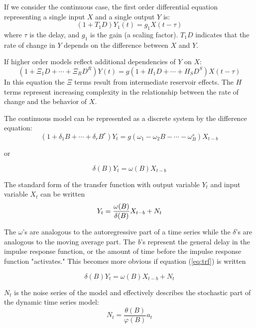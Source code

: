 \documentclass[12pt]{report}
\begin{document}
If we consider the continuous case, the first order differential
equation representing a single input \textit{$X$} and a single
output \textit{$Y$} is:
\begin{equation}
(1+T_1 D)Y_1 (t)=g_1 X(t-\tau)
\end{equation}\label{eq:diffeq}
where $\tau$ is the delay, and $g_1$ is the gain (a scaling
factor). $T_1D$ indicates that the rate of change in $Y$ depends
on the difference between $X$ and $Y$.


If higher order models reflect additional dependencies of $Y$ on
$X$:
\begin{equation}
(1+\Xi_1 D + \cdots +\Xi_R D^R)Y(t)=g(1+H_1 D+\cdots+H_S D^S)
X(t-\tau)
\end{equation}
In this equation the $\Xi$ terms result from intermediate
reservoir effects. The $H$ terms represent increasing complexity
in the relationship between the rate of change and the behavior of
$X$.

The continuous model can be represented as a discrete system by
the difference equation:
\begin{equation}
(1+\delta_1 B + \cdots +\delta_r B^r)Y_t=g(\omega_1-\omega_2 B
-\cdots-\omega_ B^s) X_{t-b}
\end{equation}

or

\begin{equation}
\delta(B)Y_t=\omega(B)X_{t-b}
\end{equation}

The standard form of the transfer function with output variable
$Y_{t}$ and input variable $X_{t}$ can be written
\begin{equation}\label{eq:trf}
Y_{t}=\frac{\omega(B)}{\delta(B)}X_{t-b}+N_{t}\\
\end{equation}

 The $\omega$'s are analogous to the autoregressive part of
a time series while the $\delta$'s are analogous to  the moving
average part. The \textit{b}'s represent the general delay in the
impulse response function, or the amount of time before the
impulse response function "activates." This becomes more obvious
if equation (\ref{eq:trf}) is written

\begin{equation}
\delta(B)Y_t=\omega(B)X_{t-b}+N_t
\end{equation}

$N_{t}$ is the noise series of the model and effectively describes
the stochastic part of the dynamic time series model:
\begin{equation}
N_{t}=\frac{\theta(B)}{\varphi(B)}a_{t}
\end{equation}
\end{document}
